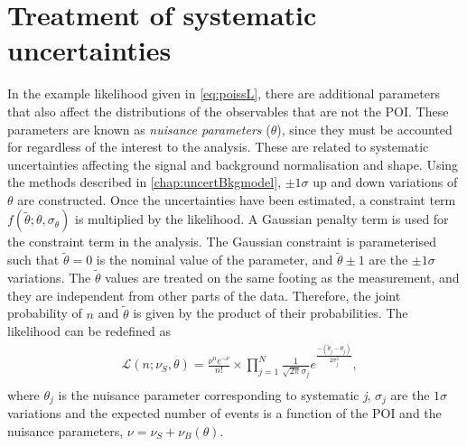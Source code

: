 \section{Treatment of systematic uncertainties}\label{sec:stats:nps}
In the example likelihood given in \cref{eq:poissL}, there are additional parameters that also affect the distributions of the observables that are not the POI. These parameters are known as \emph{nuisance parameters} ($\theta$), since they must be accounted for regardless of the interest to the analysis. These are related to systematic uncertainties affecting the signal and background normalisation and shape. Using the methods described in \cref{chap:uncertBkgmodel}, $\pm 1\sigma$ up and down variations of ${\theta}$ are constructed. Once the uncertainties have been estimated, a constraint term $f(\tilde{\theta};\theta,\sigma_\theta)$ is multiplied by the likelihood. A Gaussian penalty term is used for the constraint term in the analysis. The Gaussian constraint is parameterised such that $\tilde{\theta} = 0$ is the nominal value of the parameter, and $\tilde{\theta} \pm 1$ are the $\pm1\sigma$ variations. The $\tilde{\theta}$ values are treated on the same footing as the measurement, and they are independent from other parts of the data. Therefore, the joint probability of $n$ and $\tilde{\theta}$ is given by the product of their probabilities. The likelihood can be redefined as
\begin{equation}
    \label{eq:likelihood}
    \begin{aligned}
        & \mathcal{L}(n;\nu_S,\theta) = \frac{\nu^{n} e^{-\nu}}{n!} \times \prod_{j=1}^{N} \frac{1}{\sqrt{2\pi}\sigma_{j}} e^\frac{-(\tilde{\theta}_j - \theta_j)}{2\sigma_{j}^2} , \\
    \end{aligned}
\end{equation}
where $\theta_j$ is the nuisance parameter corresponding to systematic \emph{j}, $\sigma_j$ are the $1\sigma$ variations and the expected number of events is a function of the POI and the nuisance parameters, $\nu = \nu_S + \nu_B(\theta)$.

